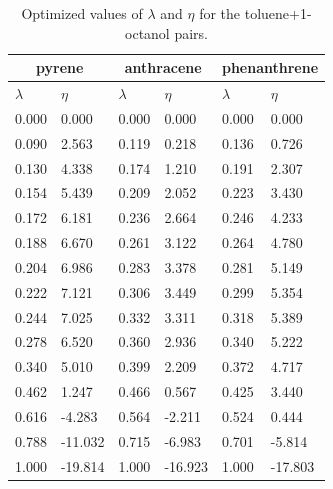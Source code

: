 \begin{table}[h]
	\centering
	\caption{Optimized values of $\lambda $ and $\eta$ for the toluene+1-octanol pairs.}
	\begin{tabular}{llllll}
		\hline
		\multicolumn{2}{c}{pyrene}& \multicolumn{2}{c}{anthracene}& \multicolumn{2}{c}{phenanthrene}\\
		\hline\hline
		$\lambda$ & $\eta$ & $\lambda$ & $\eta$  & $\lambda$ & $\eta$   \\ 
		\hline\hline
		0.000	&	0.000	&	0.000	&	0.000	&	0.000	&	0.000	\\
		0.090	&	2.563	&	0.119	&	0.218	&	0.136	&	0.726	\\
		0.130	&	4.338	&	0.174	&	1.210	&	0.191	&	2.307	\\
		0.154	&	5.439	&	0.209	&	2.052	&	0.223	&	3.430	\\
		0.172	&	6.181	&	0.236	&	2.664	&	0.246	&	4.233	\\
		0.188	&	6.670	&	0.261	&	3.122	&	0.264	&	4.780	\\
		0.204	&	6.986	&	0.283	&	3.378	&	0.281	&	5.149	\\
		0.222	&	7.121	&	0.306	&	3.449	&	0.299	&	5.354	\\
		0.244	&	7.025	&	0.332	&	3.311	&	0.318	&	5.389	\\
		0.278	&	6.520	&	0.360	&	2.936	&	0.340	&	5.222	\\
		0.340	&	5.010	&	0.399	&	2.209	&	0.372	&	4.717	\\
		0.462	&	1.247	&	0.466	&	0.567	&	0.425	&	3.440	\\
		0.616	&	-4.283	&	0.564	&	-2.211	&	0.524	&	0.444	\\
		0.788	&	-11.032	&	0.715	&	-6.983	&	0.701	&	-5.814	\\
		1.000	&	-19.814	&	1.000	&	-16.923	&	1.000	&	-17.803	\\
		
		\hline\hline
	\end{tabular}
\end{table}

